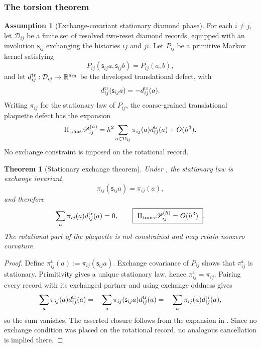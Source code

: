 \documentclass[11pt]{article}
\newtheorem{theorem}{Theorem}[section]
\theoremstyle{definition}
\newtheorem{assumption}{Assumption}[section]
\theoremstyle{remark}
\newcommand{\R}{\mathbb{R}}
\newcommand{\dCl}{d_{\mathrm{Cl}}}
\newcommand{\Pitr}{\Pi_{\mathrm{trans}}}
\newcommand{\Pcal}{\mathscr{P}}
\begin{document}
\subsubsection{The torsion theorem}

\begin{assumption}[Exchange-covariant stationary diamond phase]
\label{ass:stationary-diamond}
For each \(i\neq j\), let \(\mathcal D_{ij}\) be a finite set of resolved
two-reset diamond records, equipped with an involution
\(\mathsf s_{ij}\) exchanging the histories \(ij\) and \(ji\).  Let
\(P_{ij}\) be a primitive Markov kernel satisfying
\[
   P_{ij}(\mathsf s_{ij}a,\mathsf s_{ij}b)=P_{ij}(a,b),
\]
and let \(d^{\rm tr}_{ij}:\mathcal D_{ij}\to\R^{\dCl}\) be the developed
translational defect, with
\[
   d^{\rm tr}_{ij}(\mathsf s_{ij}a)=-d^{\rm tr}_{ij}(a).
\]
Writing \(\pi_{ij}\) for the stationary law of \(P_{ij}\), the coarse-grained
translational plaquette defect has the expansion
\[
   \Pitr\Pcal_{ij}^{(h)}
   =h^2\sum_{a\in\mathcal D_{ij}}
        \pi_{ij}(a)d^{\rm tr}_{ij}(a)+O(h^3).
\]
No exchange constraint is imposed on the rotational record.
\end{assumption}

\begin{theorem}[Stationary exchange theorem]
\label{thm:stationary-exchange}
Under , the stationary law is exchange invariant,
\[
   \pi_{ij}(\mathsf s_{ij}a)=\pi_{ij}(a),
\]
and therefore
\[
   \sum_a\pi_{ij}(a)d^{\rm tr}_{ij}(a)=0,
   \qquad
   \boxed{\ \Pitr\Pcal_{ij}^{(h)}=O(h^3)\ }.
\]
The rotational part of the plaquette is not constrained and may retain
nonzero curvature.
\end{theorem}

\begin{proof}
Define \(\pi_{ij}^{\mathsf s}(a):=\pi_{ij}(\mathsf s_{ij}a)\).  Exchange
covariance of \(P_{ij}\) shows that \(\pi_{ij}^{\mathsf s}\) is stationary.
Primitivity gives a unique stationary law, hence
\(\pi_{ij}^{\mathsf s}=\pi_{ij}\).  Pairing every record with its exchanged
partner and using exchange oddness gives
\[
   \sum_a\pi_{ij}(a)d^{\rm tr}_{ij}(a)
   =-\sum_a\pi_{ij}(\mathsf s_{ij}a)d^{\rm tr}_{ij}(a)
   =-\sum_a\pi_{ij}(a)d^{\rm tr}_{ij}(a),
\]
so the sum vanishes.  The asserted closure follows from the expansion in
.  Since no exchange condition was placed on the
rotational record, no analogous cancellation is implied there.
\end{proof}
\end{document}
